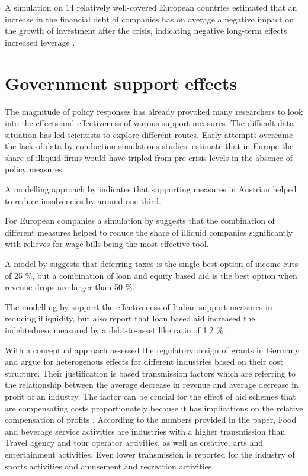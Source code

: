 A simulation on 14 relatively well-covered European countries estimated that an increase in the financial debt of companies has on average a negative impact on the growth of investment after the crisis, indicating negative long-term effects increased leverage \parencite{demmou_insolvency_2021}.




\section{Government support effects}

The magnitude of policy responses has already provoked many researchers to look into the effects and effectiveness of various support measures. The difficult data situation has led scientists to explore different routes. Early attempts overcame the lack of data by conduction simulations studies. \parencite{ebeke_corporate_2021} estimate that in Europe the share of illiquid firms would have tripled from pre-crisis levels in the absence of policy measures.

A modelling approach by \parencite{puhr_have_2021} indicates that supporting measures in Austrian helped to reduce insolvencies by around one third. 

For European companies a simulation by \parencite{demmou_liquidity_2021} suggests that the combination of different measures helped to reduce the share of illiquid companies significantly with relieves for wage bills being the most effective tool.

A model by \parencite{chang_studying_2022} suggests that deferring taxes is the single best option of income cuts of 25 \%, but a combination of loan and equity based aid is the best option when revenue drops are larger than 50 \%.

The modelling by \parencite{parlapiano_effects_2020} support the effectiveness of Italian support measures in reducing illiquidity, but also report that loan based aid increased the indebtedness measured by a debt-to-asset like ratio of 1.2 \%.

With a conceptual approach \parencite{bischof_bedeutung_2021} assessed the regulatory design of grants in Germany and argue for heterogenous effects for different industries based on their cost structure. Their justification is based transmission factors which are referring to the relationship between the average decrease in revenue and average decrease in profit of an industry. The factor can be crucial for the effect of aid schemes that are compensating costs proportionately because it has implications on the relative compensation of profits \parencite{bischof_bedeutung_2021}. According to the numbers provided in the paper, Food and beverage service activities are industries with a higher transmission than Travel agency and tour operator activities, as well as creative, arts and entertainment activities. Even lower transmission is reported for the industry of sports activities and amusement and recreation activities.

